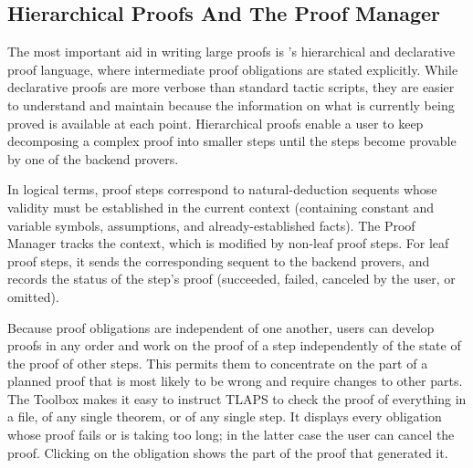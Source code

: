 \documentclass[a4paper,draft]{llncs}
\begin{document}
\subsection{Hierarchical Proofs And The Proof Manager}
\label{sec:hierarchy}

The most important aid in writing large proofs is \tlaplus's
hierarchical and declarative proof language, where intermediate proof
obligations are stated explicitly.  While declarative proofs are more
verbose than standard tactic scripts, they are easier to understand
and maintain because the information on what is currently being proved
is available at each point.  Hierarchical proofs enable a user to keep
decomposing a complex proof into smaller steps until the steps become
provable by one of the backend provers.

In logical terms, proof steps correspond to natural-deduction sequents whose
validity must be established in the current context (containing constant and
variable symbols, assumptions, and already-established facts). The Proof Manager
tracks the context, which is modified by non-leaf proof steps. For leaf proof
steps, it sends the corresponding sequent to the backend
provers, and records the status of the step's proof (succeeded, failed, canceled
by the user, or omitted).


Because proof obligations are independent of one another,
users can develop proofs in any order and work on the proof of a step
independently of the state of the proof of other steps.  This
permits them to concentrate on the part of a planned proof that is most likely
to be wrong and require changes to other parts.  The
Toolbox makes it easy to instruct TLAPS to check the proof of
everything in a file, of any single theorem, or of any single step.
It displays every obligation whose proof fails or
is taking too long; in the latter case the user can cancel the proof.
Clicking on the obligation shows the part of the proof that generated
it.
\end{document}
